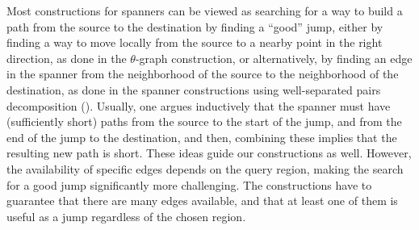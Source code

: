 Most constructions for spanners can be viewed as searching for a way
to build a path from the source to the destination by finding a
``good'' jump, either by finding a way to move locally from the source
to a nearby point in the right direction, as done in the
$\theta$-graph construction, or alternatively, by finding an edge in
the spanner from the neighborhood of the source to the neighborhood of
the destination, as done in the spanner constructions using
well-separated pairs decomposition (\WSPD). Usually, one argues
inductively that the spanner must have (sufficiently short) paths from
the source to the start of the jump, and from the end of the jump to
the destination, and then, combining these implies that the resulting
new path is short.  These ideas guide our constructions as
well. However, the availability of specific edges depends on the query
region, making the search for a good jump significantly more
challenging. The constructions have to guarantee that there are many
edges available, and that at least one of them is useful as a jump
regardless of the chosen region.


